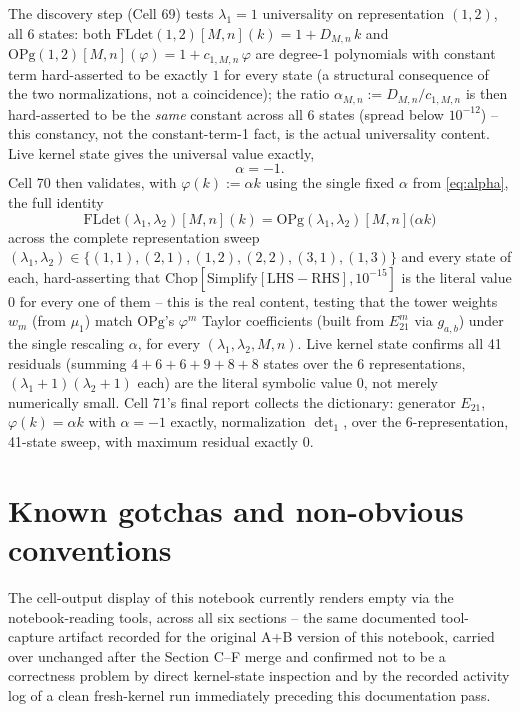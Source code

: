 \documentclass[11pt]{article}
\begin{document}
The discovery step (Cell 69) tests $\lambda_1=1$ universality on representation $(1,2)$, all 6
states: both $\mathrm{FLdet}(1,2)[M,n](k) = 1 + D_{M,n}\,k$ and
$\mathrm{OPg}(1,2)[M,n](\varphi) = 1 + c_{1,M,n}\,\varphi$ are degree-1 polynomials with constant
term hard-asserted to be exactly $1$ for every state (a structural consequence of the two
normalizations, not a coincidence); the ratio
$\alpha_{M,n} := D_{M,n}/c_{1,M,n}$ is then hard-asserted to be the \emph{same} constant across all
6 states (spread below $10^{-12}$) -- this constancy, not the constant-term-1 fact, is the actual
universality content. Live kernel state gives the universal value exactly,
\begin{equation}
  \alpha = -1.
  \label{eq:alpha}
\end{equation}
Cell 70 then validates, with $\varphi(k) := \alpha k$ using the single fixed $\alpha$ from
\eqref{eq:alpha}, the full identity
\begin{equation}
  \mathrm{FLdet}(\lambda_1,\lambda_2)[M,n](k) = \mathrm{OPg}(\lambda_1,\lambda_2)[M,n]\bigl(\alpha k\bigr)
  \label{eq:dictionary}
\end{equation}
across the complete representation sweep $(\lambda_1,\lambda_2)\in\{(1,1),(2,1),(1,2),(2,2),(3,1),
(1,3)\}$ and every state of each, hard-asserting that
$\mathrm{Chop}[\mathrm{Simplify}[\mathrm{LHS}-\mathrm{RHS}],10^{-15}]$ is the literal value $0$ for
every one of them -- this is the real content, testing that the tower weights $w_m$ (from $\mu_1$)
match $\mathrm{OPg}$'s $\varphi^m$ Taylor coefficients (built from $E_{21}^m$ via $g_{a,b}$) under
the single rescaling $\alpha$, for every $(\lambda_1,\lambda_2,M,n)$. Live kernel state confirms all
41 residuals (summing $4+6+6+9+8+8$ states over the 6 representations,
$(\lambda_1+1)(\lambda_2+1)$ each) are the literal symbolic value $0$, not merely numerically small.
Cell 71's final report collects the dictionary: generator $E_{21}$, $\varphi(k)=\alpha k$ with
$\alpha=-1$ exactly, normalization $\det_1$, over the 6-representation, 41-state sweep, with maximum
residual exactly $0$.

\section{Known gotchas and non-obvious conventions}

The cell-output display of this notebook currently renders empty via the notebook-reading tools,
across all six sections -- the same documented tool-capture artifact recorded for the original A+B
version of this notebook, carried over unchanged after the Section C--F merge and confirmed not to
be a correctness problem by direct kernel-state inspection and by the recorded activity log of a
clean fresh-kernel run immediately preceding this documentation pass.
\end{document}

